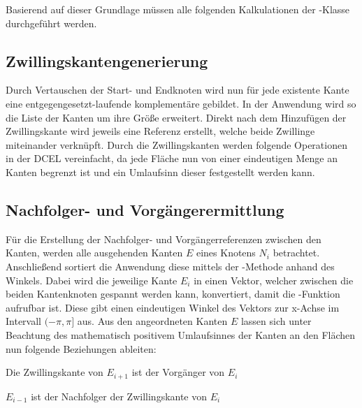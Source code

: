 Basierend auf dieser Grundlage müssen alle folgenden Kalkulationen der -Klasse durchgeführt werden.

\subsection{Zwillingskantengenerierung}
Durch Vertauschen der Start- und Endknoten wird nun für jede existente Kante eine entgegengesetzt-laufende komplementäre  gebildet.
In der Anwendung wird so die Liste der Kanten um ihre Größe erweitert.
Direkt nach dem Hinzufügen der Zwillingskante wird jeweils eine Referenz erstellt, welche beide Zwillinge miteinander verknüpft. 
Durch die Zwillingskanten werden folgende Operationen in der DCEL vereinfacht, da jede Fläche nun von einer eindeutigen Menge an Kanten begrenzt ist und ein Umlaufsinn dieser festgestellt werden kann.

\subsection{Nachfolger- und Vorgängerermittlung}
Für die Erstellung der Nachfolger- und Vorgängerreferenzen zwischen den Kanten, werden alle ausgehenden Kanten $E$ eines Knotens $N_i$ betrachtet.
Anschließend sortiert die Anwendung diese mittels der -Methode anhand des Winkels.
Dabei wird die jeweilige Kante $E_i$ in einen Vektor, welcher zwischen die beiden Kantenknoten gespannt werden kann, konvertiert, damit die -Funktion aufrufbar ist.
Diese gibt einen eindeutigen Winkel des Vektors zur x-Achse im Intervall $(-\pi,\pi]$ aus.
Aus den angeordneten Kanten $E$ lassen sich unter Beachtung des mathematisch positivem Umlaufsinnes der Kanten an den Flächen nun folgende Beziehungen ableiten:

\begin{compactenum}
	\item Die Zwillingskante von $E_{i+1}$ ist der Vorgänger von $E_i$
	\item $E_{i-1}$ ist der Nachfolger der Zwillingskante von $E_i$ 
\end{compactenum}

